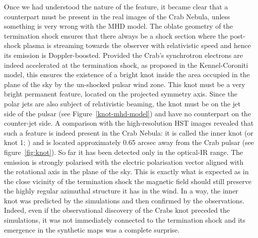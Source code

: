 Once we had understood the nature of the feature, it became clear that a counterpart must be present in the real images of the Crab Nebula, unless something is very wrong with the MHD model. The oblate geometry of the termination shock ensures that there always be a shock section where the post-shock plasma is streaming towards the observer with relativistic speed and hence its emission is Doppler-boosted.   Provided the Crab’s synchrotron electrons are indeed accelerated at the termination shock, as proposed in the Kennel-Coroniti model, this ensures the existence of a bright knot inside the area occupied in the plane of the sky by the un-shocked pulsar wind zone.  This knot must be a very bright permanent feature, located on the projected symmetry axis. Since the polar jets are also subject of relativistic beaming, the knot must be on the jet side of the pulsar (see Figure~\ref{knot-mhd-model}) and have no counterpart on the counter-jet side.      
A comparison with the high-resolution HST images revealed that such a feature is indeed present  in the Crab Nebula: 
it is called the inner knot (or knot 1; \citet{hester-95}) and is located approximately 0.65 arcsec away from the Crab pulsar (see figure~\ref{fig:knot}).  
So far it has been detected only in the optical-IR range.  The emission is strongly polarised with the electric polarisation vector aligned with the rotational axis in the plane of the sky. This is exactly what is expected as in the close vicinity of the termination shock the magnetic field should still preserve the highly regular azimuthal structure it has in the wind.  In a way, the inner knot was predicted by the simulations and then confirmed by the observations. Indeed, even if the observational discovery of the Crabs knot  preceded  the simulations, it was not immediately connected to the termination shock and its emergence in the synthetic maps was a complete surprise.      